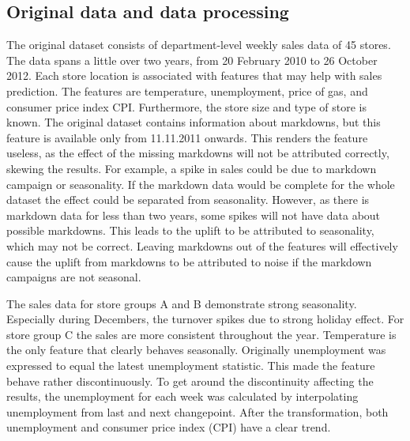 \documentclass[english, 12pt, a4paper, sci, utf8, a-1b, online]{aaltothesis}
\begin{document}
\begin{abstractpage}[english]

\subsection{Original data and data processing}

The original dataset consists of department-level weekly sales data of 45 stores. The data spans a little over two years, from 20 February 2010 to 26 October 2012. Each store location is associated with features that may help with sales prediction. The features are temperature, unemployment, price of gas, and consumer price index CPI. Furthermore, the store size and type of store is known. The original dataset contains information about markdowns, but this feature is available only from 11.11.2011 onwards. This renders the feature useless, as the effect of the missing markdowns will not be attributed correctly, skewing the results. For example, a spike in sales could be due to markdown campaign or seasonality. If the markdown data would be complete for the whole dataset the effect could be separated from seasonality. However, as there is markdown data for less than two years, some spikes will not have data about possible markdowns. This leads to the uplift to be attributed to seasonality, which may not be correct. Leaving markdowns out of the features will effectively cause the uplift from markdowns to be attributed to noise if the markdown campaigns are not seasonal.

The sales data for store groups A and B demonstrate strong seasonality. Especially during Decembers, the turnover spikes due to strong holiday effect. For store group C the sales are more consistent throughout the year. Temperature is the only feature that clearly behaves seasonally. Originally unemployment was expressed to equal the latest unemployment statistic. This made the feature behave rather discontinuously. To get around the discontinuity affecting the results, the unemployment for each week was calculated by interpolating unemployment from last and next changepoint. After the transformation, both unemployment and consumer price index (CPI) have a clear trend. 



\end{abstractpage}
\end{document}
